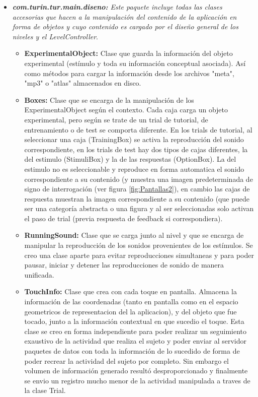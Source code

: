 \documentclass{article}
\begin{document}
\begin{itemize}
        \item \textit{\textbf{com.turin.tur.main.diseno:} Este paquete incluye todas las clases accesorias que hacen a la manipulación del contenido de la aplicación en forma de objetos y cuyo contenido es cargado por el diseño general de los niveles y el LevelController}.
        \begin{itemize}
            \item \textbf{ExperimentalObject:} Clase que guarda la información del objeto experimental (estímulo y toda su información conceptual asociada). Así como métodos para cargar la información desde los archivos "meta", "mp3" o "atlas" almacenados en disco. 
            \item \textbf{Boxes:} Clase que se encarga de la manipulación de los ExperimentalObject según el contexto. Cada caja carga un objeto experimental, pero según se trate de un trial de tutorial, de entrenamiento o de test se comporta diferente. En los trials de tutorial, al seleccionar una caja (TrainingBox) se activa la reproducción del sonido correspondiente, en los trials de test hay dos tipos de cajas diferentes, la del estimulo (StimuliBox) y la de las respuestas (OptionBox). La del estimulo no es seleccionable y reproduce en forma automatica el sonido correspondiente a su contenido (y muestra una imagen predeterminada de signo de interrogación (ver figura \ref{fig:Pantallas2}), en cambio las cajas de respuesta muestran la imagen correspondiente a su contenido (que puede ser una categoría abstracta o una figura y al ser seleccionadas solo activan el paso de trial (previa respuesta de feedback si correspondiera).  
            \item \textbf{RunningSound:} Clase que se carga junto al nivel y que se encarga de manipular la reproducción de los sonidos provenientes de los estímulos. Se creo una clase aparte para evitar reproducciones simultaneas y para poder pausar, iniciar y detener las reproducciones de sonido de manera unificada. 
            \item \textbf{TouchInfo:} Clase que crea con cada toque en pantalla. Almacena la información de las coordenadas (tanto en pantalla como en el espacio geometricos de representacion del la aplicacion), y del objeto que fue tocado, junto a la información contextual en que sucedio el toque. Esta clase se creo en forma independiente para poder realizar un seguimiento exaustivo de la actividad que realiza el sujeto y poder enviar al servidor paquetes de datos con toda la información de lo sucedido de forma de poder recrear la actividad del sujeto por completo. Sin embargo el volumen de información generado resultó desproporcionado y finalmente se envio un registro mucho menor de la actividad manipulada a traves de la clase Trial.

\end{itemize}
\end{itemize}
\end{document}
